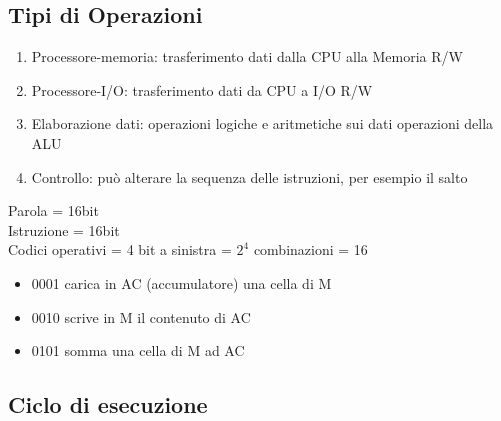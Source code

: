 \documentclass[12pt, a4paper]{article}
\begin{document}
\subsection{Tipi di Operazioni}

\begin{enumerate}
	\item Processore-memoria: trasferimento dati dalla CPU alla Memoria R/W
	\item Processore-I/O: trasferimento dati da CPU a I/O               R/W
	\item Elaborazione dati: operazioni logiche e aritmetiche sui dati
		operazioni della ALU
	\item Controllo: può alterare la sequenza delle istruzioni, per esempio
		il salto
\end{enumerate}

\begin{esem}	
Parola = 16bit\\
Istruzione = 16bit\\
Codici operativi = 4 bit a sinistra = $2^4$ combinazioni = 16\\

\begin{itemize}
	\item 0001 carica in AC (accumulatore) una cella di M
	\item 0010 scrive in M il contenuto di AC
	\item 0101 somma una cella di M ad AC
\end{itemize}
\end{esem}

\subsection{Ciclo di esecuzione}
\end{document}
